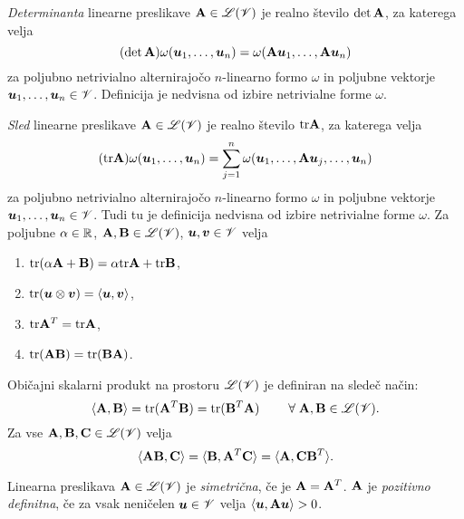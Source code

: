 \emph{Determinanta} linearne preslikave $\mathbf A\in\mathscr L(\mathscr V)$ je realno število $\det\mathbf A$,
za katerega velja
\[
	(\det\mathbf A)\omega(\boldsymbol u_1,\dots,\boldsymbol u_n)=\omega(\mathbf A\boldsymbol u_1,\dots,\mathbf A\boldsymbol u_n)
\]
za poljubno netrivialno alternirajočo $n$-linearno formo $\omega$ in poljubne vektorje $\boldsymbol u_1,\dots,\boldsymbol u_n\in\mathscr V$.
Definicija je nedvisna od izbire netrivialne forme $\omega$.

\emph{Sled} linearne preslikave $\mathbf A\in\mathscr L(\mathscr V)$ je realno število $\mathrm{tr}\mathbf A$,
za katerega velja
\[
	(\mathrm{tr}\mathbf A)\omega(\boldsymbol u_1,\dots,\boldsymbol u_n)
	=\sum_{j=1}^n\omega(\boldsymbol u_1,\dots,\mathbf A\boldsymbol u_j,\dots,\boldsymbol u_n)
\]
za poljubno netrivialno alternirajočo $n$-linearno formo $\omega$ in poljubne vektorje $\boldsymbol u_1,\dots,\boldsymbol u_n\in\mathscr V$.
Tudi tu je definicija nedvisna od izbire netrivialne forme $\omega$.
Za poljubne $\alpha\in\mathbb R$, $\mathbf A,\mathbf B\in\mathscr L(\mathscr V)$, $\boldsymbol u,\boldsymbol v\in\mathscr V$ velja
\begin{enumerate} \label{traceprop}
	\item $\mathrm{tr}(\alpha\mathbf A+\mathbf B)=\alpha\mathrm{tr}\mathbf A+\mathrm{tr}\mathbf B$,
	\item $\mathrm{tr}(\boldsymbol u\otimes\boldsymbol v)=\langle\boldsymbol u,\boldsymbol v\rangle$,
	\item $\mathrm{tr}\mathbf A^T=\mathrm{tr}\mathbf A$,
	\item $\mathrm{tr}(\mathbf A\mathbf B)=\mathrm{tr}(\mathbf B\mathbf A)$.
\end{enumerate}

Običajni skalarni produkt na prostoru $\mathscr L(\mathscr V)$ je definiran na sledeč način:
\begin{equation*} %
	\langle\ten{A},\ten{B}\rangle=\tr(\ten{A}^T\ten{B})=\tr(\ten{B}^T\ten{A})
	\qquad\;\forall\;\ten{A},\ten{B}\in\L(\V).
\end{equation*}
Za vse $\mathbf A,\mathbf B,\mathbf C\in\mathscr L(\mathscr V)$ velja
\begin{equation} \label{e:skatra}
	\langle\mathbf A\mathbf B,\mathbf C\rangle=\langle\mathbf B,\mathbf A^{T}\mathbf C\rangle
	=\langle\mathbf A,\mathbf C\mathbf B^{T}\rangle.
\end{equation}

Linearna preslikava $\mathbf A\in\mathscr L(\mathscr V)$ je \emph{simetrična}, če je $\mathbf A=\mathbf A^T$.
$\mathbf A$ je \emph{pozitivno definitna}, če za vsak neničelen $\boldsymbol u\in\mathscr V$ velja
$\langle\boldsymbol u,\mathbf A\boldsymbol u\rangle >0$.

